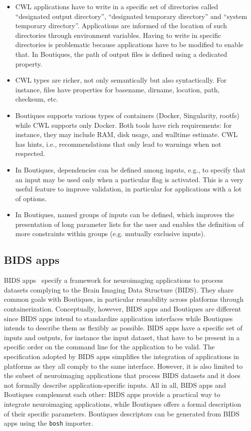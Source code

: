 \documentclass[a4paper,num-refs]{oup-contemporary}
\newcommand{\boutiques}{Boutiques\xspace}
\begin{document}
\begin{itemize}
\item CWL applications have to write in a specific set of directories called
``designated output directory'', ``designated temporary directory''
and ``system temporary directory''. Applications are informed of the location
of such directories through environment variables. Having to write in
specific directories is problematic because applications have to be modified
to enable that. In \boutiques, the path of output files is defined
using a dedicated property.
\item CWL types are richer, not only
semantically but also syntactically. For instance, files have
properties for basename, dirname, location, path, checksum, etc.
\item \boutiques supports various types of containers (Docker,
  Singularity, rootfs) while CWL supports only Docker. Both tools have
  rich requirements: for instance, they may include RAM, disk usage,
  and walltime estimate. CWL has hints, i.e., recommendations that
  only lead to warnings when not respected.
\item In \boutiques, dependencies can be defined among inputs, e.g., to
specify that an input may be used only when a particular flag is
activated. This is a very useful feature to improve validation, in
particular for applications with a lot of options.
\item In \boutiques, named
groups of inputs can be defined, which improves the presentation of
long parameter lists for the user and enables the definition of more
constraints within groups (e.g. mutually exclusive inputs).
\end{itemize}

\subsection{BIDS apps}

BIDS apps~\cite{gorgolewski2017bids} specify a framework for
neuroimaging applications to process datasets complying to the Brain
Imaging Data Structure (BIDS). They share common goals with
\boutiques, in particular reusability across platforms through
containerization. Conceptually, however, BIDS apps and \boutiques are
different since BIDS apps intend to standardize application interfaces
while \boutiques intends to describe them as flexibly as
possible. BIDS apps have a specific set of inputs and outputs, for
instance the input dataset, that have to be present in a specific
order on the command line for the application to be valid. The
specification adopted by BIDS apps simplifies the integration of
applications in platforms as they all comply to the same
interface. However, it is also limited to the subset of neuroimaging
applications that process BIDS datasets and it does not formally
describe application-specific inputs. All in all, BIDS apps and
\boutiques complement each other: BIDS apps provide a practical way to
integrate neuroimaging applications, while \boutiques offers a formal
description of their specific parameters.  \boutiques descriptors can
be generated from BIDS apps using the \texttt{bosh} importer. 
\end{document}
